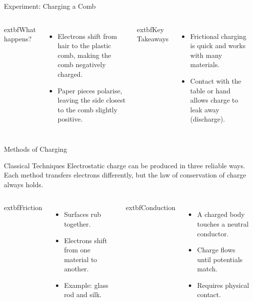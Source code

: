 \begin{frame}
\begin{frame}{Experiment: Charging a Comb}
    \begin{columns}[T,totalwidth=\textwidth]
            	extbf{What happens?}
            \begin{itemize}
                \item Electrons shift from hair to the plastic comb, making the comb negatively charged.
                \item Paper pieces polarise, leaving the side closest to the comb slightly positive.
            \end{itemize}

            	extbf{Key Takeaways}
            \begin{itemize}
                \item Frictional charging is quick and works with many materials.
                \item Contact with the table or hand allows charge to leak away (discharge).
            \end{itemize}
    \end{columns}
\end{frame}

\begin{frame}{Methods of Charging}
    \begin{conceptdiagram}{Classical Techniques}
        Electrostatic charge can be produced in three reliable ways. Each method transfers electrons differently, but the law of conservation of charge always holds.
    \end{conceptdiagram}

    \begin{columns}[T,totalwidth=\textwidth]
            	extbf{Friction}
            \begin{itemize}
                \item Surfaces rub together.
                \item Electrons shift from one material to another.
                \item Example: glass rod and silk.
            \end{itemize}

            	extbf{Conduction}
            \begin{itemize}
                \item A charged body touches a neutral conductor.
                \item Charge flows until potentials match.
                \item Requires physical contact.
            \end{itemize}


\end{columns}
\end{frame}
\end{frame}
